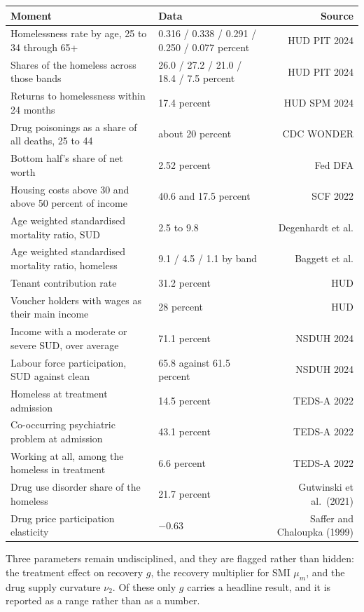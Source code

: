 \documentclass[10pt]{article}
\begin{document}
\begin{center}\footnotesize
\begin{tabular}{@{}lL{5.6cm}r@{}}
\toprule
Moment & Data & Source \\
\midrule
Homelessness rate by age, 25 to 34 through 65+
 & 0.316 / 0.338 / 0.291 / 0.250 / 0.077 percent & HUD PIT 2024 \\
Shares of the homeless across those bands
 & 26.0 / 27.2 / 21.0 / 18.4 / 7.5 percent & HUD PIT 2024 \\
Returns to homelessness within 24 months & 17.4 percent & HUD SPM 2024 \\
Drug poisonings as a share of all deaths, 25 to 44 & about 20 percent & CDC WONDER \\
Bottom half's share of net worth & 2.52 percent & Fed DFA \\
Housing costs above 30 and above 50 percent of income & 40.6 and 17.5 percent & SCF 2022 \\
Age weighted standardised mortality ratio, SUD & 2.5 to 9.8 & Degenhardt et al. \\
Age weighted standardised mortality ratio, homeless & 9.1 / 4.5 / 1.1 by band & Baggett et al. \\
Tenant contribution rate & 31.2 percent & HUD \\
Voucher holders with wages as their main income & 28 percent & HUD \\
Income with a moderate or severe SUD, over average & 71.1 percent & NSDUH 2024 \\
Labour force participation, SUD against clean & 65.8 against 61.5 percent & NSDUH 2024 \\
Homeless at treatment admission & 14.5 percent & TEDS-A 2022 \\
Co-occurring psychiatric problem at admission & 43.1 percent & TEDS-A 2022 \\
Working at all, among the homeless in treatment & 6.6 percent & TEDS-A 2022 \\
Drug use disorder share of the homeless & 21.7 percent & Gutwinski et al.\ (2021) \\
Drug price participation elasticity & $-0.63$ & Saffer and Chaloupka (1999) \\
\bottomrule
\end{tabular}
\end{center}

Three parameters remain undisciplined, and they are flagged rather than hidden:
the treatment effect on recovery $g$, the recovery multiplier for SMI
$\mu_m$, and the drug supply
curvature $\nu_2$. Of these only $g$ carries a headline result, and it is
reported as a range rather than as a number.
\end{document}
